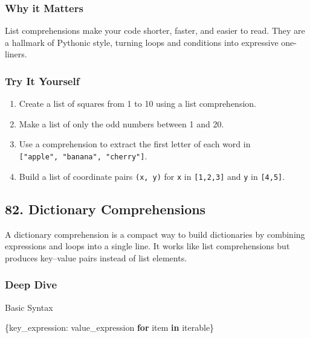 \documentclass[
  letterpaper,
  DIV=11,
  numbers=noendperiod]{scrreprt}
\newenvironment{Shaded}{\begin{snugshade}}{\end{snugshade}}
\newcommand{\ControlFlowTok}[1]{\textcolor[rgb]{0.00,0.23,0.31}{\textbf{#1}}}
\newcommand{\KeywordTok}[1]{\textcolor[rgb]{0.00,0.23,0.31}{\textbf{#1}}}
\newcommand{\NormalTok}[1]{\textcolor[rgb]{0.00,0.23,0.31}{#1}}
\providecommand{\tightlist}{%
  \setlength{\itemsep}{0pt}\setlength{\parskip}{0pt}}
\begin{document}
\subsubsection{Why it Matters}\label{why-it-matters-80}

List comprehensions make your code shorter, faster, and easier to read.
They are a hallmark of Pythonic style, turning loops and conditions into
expressive one-liners.

\subsubsection{Try It Yourself}\label{try-it-yourself-80}

\begin{enumerate}
\def\labelenumi{\arabic{enumi}.}
\tightlist
\item
  Create a list of squares from 1 to 10 using a list comprehension.
\item
  Make a list of only the odd numbers between 1 and 20.
\item
  Use a comprehension to extract the first letter of each word in
  \texttt{{[}"apple",\ "banana",\ "cherry"{]}}.
\item
  Build a list of coordinate pairs \texttt{(x,\ y)} for \texttt{x} in
  \texttt{{[}1,2,3{]}} and \texttt{y} in \texttt{{[}4,5{]}}.
\end{enumerate}

\subsection{82. Dictionary
Comprehensions}\label{dictionary-comprehensions}

A dictionary comprehension is a compact way to build dictionaries by
combining expressions and loops into a single line. It works like list
comprehensions but produces key--value pairs instead of list elements.

\subsubsection{Deep Dive}\label{deep-dive-81}

Basic Syntax

\begin{Shaded}
\begin{Highlighting}[]
\NormalTok{\{key\_expression: value\_expression }\ControlFlowTok{for}\NormalTok{ item }\KeywordTok{in}\NormalTok{ iterable\}}
\end{Highlighting}
\end{Shaded}
\end{document}
